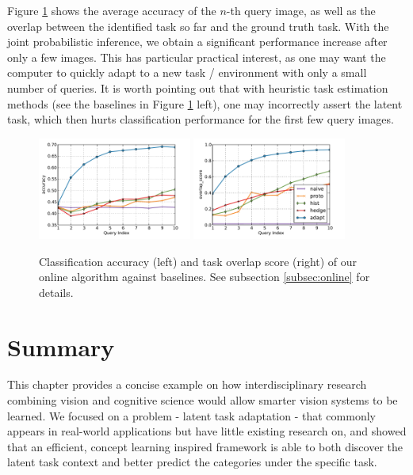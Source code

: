 Figure \ref{fig:online} shows the average accuracy of the $n$-th query image, as well as the overlap between the identified task so far and the ground truth task. With the joint probabilistic inference, we obtain a significant performance increase after only a few images. This has particular practical interest, as one may want the computer to quickly adapt to a new task / environment with only a small number of queries. It is worth pointing out that with heuristic task estimation methods (see the baselines in Figure \ref{fig:online} left), one may incorrectly assert the latent task, which then hurts classification performance for the first few query images.

\begin{figure}
    \centering
    \includegraphics[width=0.45\textwidth]{figs/taskadaptation/online_accuracy.pdf}%
    \includegraphics[width=0.45\textwidth]{figs/taskadaptation/online_overlap_score.pdf}
    \caption{Classification accuracy (left) and task overlap score (right) of our online algorithm against baselines. See subsection \ref{subsec:online} for details.}\label{fig:online}
\end{figure}

\section{Summary}
This chapter provides a concise example on how interdisciplinary research combining vision and cognitive science would allow smarter vision systems to be learned. We focused on a problem - latent task adaptation - that commonly appears in real-world applications but have little existing research on, and showed that an efficient, concept learning inspired framework is able to both discover the latent task context and better predict the categories under the specific task.

